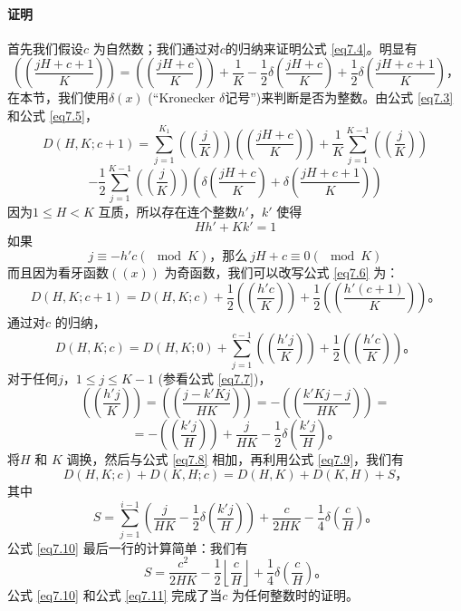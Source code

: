 \documentclass[11pt,a4paper]{article}
\newcommand{\wuhao}{\fontsize{10.5pt}{18pt}\selectfont}
\newcommand\seccontent{
	\wuhao %
    \setlength{\parindent}{2em} %
    \setlength{\parskip}{0pt}
    }
\theoremstyle{definition}
\newcommand{\refeq}[1]{公式 \ref{#1}}
\numberwithin{equation}{section}
\newcommand{\comma}{\text{，}}
\newcommand{\juhao}{\text{。}}
\newcommand{\mathmod}[3]{ #1\equiv#2\left(\!\!\mod#3\right) }
\newcommand{\dekd}{D\left(H,K\right)}
\newcommand{\dekdKH}{D\left(K,H\right)}
\newcommand{\ddbrace}[1]{\left(\left(#1\right)\right)}
\newcommand{\glHKdekd}[1]{D\left(H, K; #1\right)}
\newcommand{\glKHdekd}[1]{D\left(K, H; #1\right)}
\begin{document}
\paragraph{证明} \seccontent 首先我们假设$ c $ 为自然数；我们通过对$ c $的归纳来证明\refeq{eq7.4}。明显有
\begin{equation}\label{eq7.5}
\ddbrace{\dfrac{jH+c+1}{K}}=\ddbrace{\dfrac{jH+c}{K}}+\dfrac{1}{K}-\dfrac{1}{2}\delta\left(\dfrac{jH+c}{K}\right)+\dfrac{1}{2}\delta\left(\dfrac{jH+c+1}{K}\right)\comma
\end{equation}
在本节，我们使用$ \delta\left(x\right) $ (``Kronecker $ \delta $记号'')来判断是否为整数。由\refeq{eq7.3} 和\refeq{eq7.5}，
\[ \glHKdekd{c+1}=\sum_{j=1}^{K_{1}}\ddbrace{\dfrac{j}{K}}\ddbrace{\dfrac{jH+c}{K}}+\dfrac{1}{K}\sum_{j=1}^{K-1}\ddbrace{\dfrac{j}{K}}  \]
\begin{equation}\label{eq7.6}
-\dfrac{1}{2}\sum_{j=1}^{K-1}\ddbrace{\dfrac{j}{K}}\left(\delta\left(\dfrac{jH+c}{K}\right)+\delta\left(\dfrac{jH+c+1}{K}\right)\right)
\end{equation}
因为$ 1\leq H < K $ 互质，所以存在连个整数$ h'\comma k' $ 使得
\begin{equation}\label{eq7.7}
	Hh'+Kk'=1
\end{equation}
如果
\[ \mathmod{j}{-h'c}{K} \comma\text{那么} \:\mathmod{jH+c}{0}{K} \]
而且因为看牙函数$ \ddbrace{x} $ 为奇函数，我们可以改写\refeq{eq7.6} 为：
\[ \glHKdekd{c+1}=\glHKdekd{c}+\dfrac{1}{2}\ddbrace{\dfrac{h'c}{K}}+\dfrac{1}{2}\ddbrace{\dfrac{h'\left(c+1\right)}{K}}\juhao \]
通过对$ c $ 的归纳，
\begin{equation}\label{eq7.8}
	\glHKdekd{c}=\glHKdekd{0}+\sum_{j=1}^{c-1}\ddbrace{\dfrac{h'j}{K}}+\dfrac{1}{2}\ddbrace{\dfrac{h'c}{K}}\juhao
\end{equation}  
对于任何$ j\comma 1\leq j \leq K-1 $ (参看\refeq{eq7.7})，
\[ 	\ddbrace{\dfrac{h'j}{K}}=\ddbrace{\dfrac{j-k'Kj}{HK}}=-\ddbrace{\dfrac{k'Kj-j}{HK}}= \]
\begin{equation}\label{eq7.9}
	=-\ddbrace{\dfrac{k'j}{H}}+\dfrac{j}{HK}-\dfrac{1}{2}\delta\left(\dfrac{k'j}{H}\right)\juhao
\end{equation}
将$ H $ 和 $ K $ 调换，然后与\refeq{eq7.8} 相加，再利用\refeq{eq7.9}，我们有
\[ \glHKdekd{c}+\glKHdekd{c}=\dekd+\dekdKH+S\comma \]
其中
\begin{equation}\label{eq7.10}
S=\sum_{j=1}^{i-1}\left(\dfrac{j}{HK}-\dfrac{1}{2}\delta\left(\dfrac{k'j}{H}\right)\right)+\dfrac{c}{2HK}-\dfrac{1}{4}\delta\left(\dfrac{c}{H}\right)\juhao
\end{equation}
\refeq{eq7.10} 最后一行的计算简单：我们有
\begin{equation}\label{eq7.11}
	S=\dfrac{c^{2}}{2HK}-\dfrac{1}{2}\left\lfloor\dfrac{c}{H}\right\rfloor+\dfrac{1}{4}\delta\left(\dfrac{c}{H}\right)\juhao
\end{equation}
\refeq{eq7.10} 和\refeq{eq7.11} 完成了当$ c $ 为任何整数时的证明。
\end{document}
